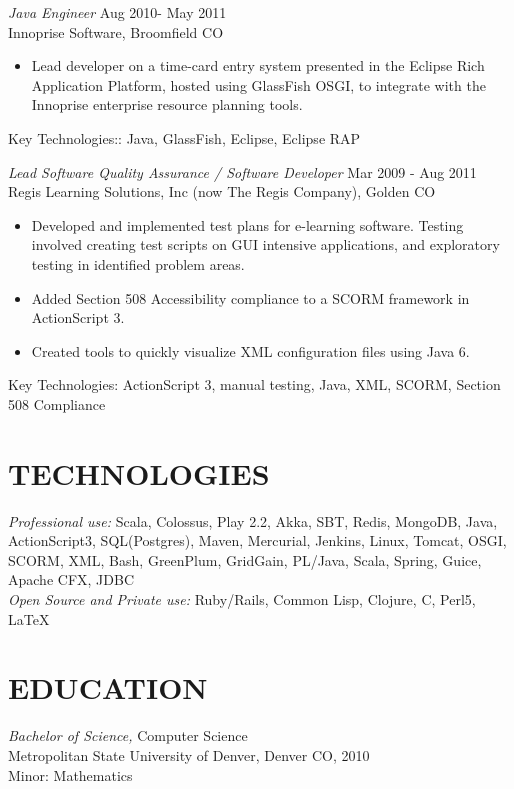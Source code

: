 \documentclass[line,margin]{res}
\begin{document}
\begin{resume}
{\sl Java Engineer} \hfill          Aug 2010- May 2011 \\
                Innoprise Software, Broomfield CO
                 \begin{itemize} %
                 \item Lead developer on a time-card entry system presented in the Eclipse Rich Application Platform, hosted using GlassFish OSGI, to integrate with the Innoprise enterprise resource planning tools.
\end{itemize} 
	     Key Technologies:: Java, GlassFish, Eclipse, Eclipse RAP
	    
                {\sl Lead Software Quality Assurance / Software Developer} \hfill  Mar 2009 - Aug 2011 \\
                Regis Learning Solutions, Inc (now The Regis Company), Golden CO
                  \begin{itemize} %
                   \item Developed and implemented test plans for e-learning software. Testing involved creating test scripts on GUI intensive applications, and exploratory testing in identified problem areas.
		\item Added Section 508 Accessibility compliance to a SCORM framework in ActionScript 3.
		\item Created tools to quickly visualize XML configuration files using Java 6.
    \end{itemize} 
		Key Technologies: ActionScript 3, manual testing, Java, XML, SCORM, Section 508 Compliance
            
 \section{TECHNOLOGIES} {\sl Professional use:} Scala, Colossus, Play 2.2, Akka, SBT, Redis, MongoDB, Java, ActionScript3, SQL(Postgres), Maven, Mercurial, Jenkins, Linux, Tomcat, OSGI, SCORM, XML, Bash, GreenPlum, GridGain, PL/Java, Scala, Spring, Guice, Apache CFX, JDBC  \\
                {\sl Open Source and Private use:} Ruby/Rails, Common Lisp, Clojure, C, Perl5, \LaTeX \\

\section{EDUCATION} {\sl Bachelor of Science,} Computer Science \\
               Metropolitan State University of Denver, Denver CO, 2010 \\
               Minor: Mathematics


\end{resume}
\end{document}
